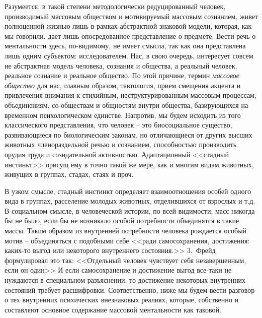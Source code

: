 Разумеется, в такой степени методологически редуцированный человек, производимый массовым обществом и
мотивируемый массовым сознанием, живет полноценной жизнью лишь в рамках абстрактной знаковой модели,
которая, как мы говорили, дает лишь опосредованное представление о предмете. Вести речь о ментальности
здесь, по-видимому, не имеет смысла, так как она представлена лишь одним субъектом: исследователем.
Нас, в свою очередь, интересует совсем не абстрактная модель человека, сознания и общества, а реальный человек,
реальное сознание и реальное общество. По этой причине, термин \emph{массовое общество} для нас, главным образом,
тавтология, прием смещения акцента и привлечения внимания к стихийным, неструктурированным массовым процессам,
объединениям, со-обществам и общностям внутри общества, базирующихся на временном психологическом единстве.
Напротив, мы будем исходить из того классического представления, что человек -- это биосоциальное существо,
развивающиеся по биологическим законам, но отличающиеся от других высших животных членораздельной речью и
сознанием, способностью производить орудия труда и созидательной активностью. Адаптационный <<стадный инстинкт>>
присущ ему в точно такой же мере, как и многим видам животных, живущих в группах, стадах, стаях и проч.

В узком смысле, стадный инстинкт определяет взаимоотношения особей одного вида в группах, расселение молодых животных,
отделившихся от взрослых и т.д. В социальном смысле, в человеческой истории, по всей видимости, масс никогда бы не
было, если бы не возникало особой потребности объединятся в такие массы. Таким образом из внутренней потребности
человека рождается особый мотив -- объединяться с подобными себе <<ради самосохранения, достижения: каких-то выгод
или некоторого внутреннего состояния.>>\autocite{olshansky} 3.~Фрейд формулировал это так: <<Отдельный человек чувствует
себя незавершенным, если он один>>\autocite{freid_mass} И если самосохранение и достижение выгод все-таки не
нуждаются в специальном разъяснении, то достижение некоторых внутренних состояний требует расшифровки.
Соответственно, ниже мы будем вести разговор о тех внутренних психических внезнаковых реалиях, которые,
собственно и составляют основное содержание массовой ментальности как таковой.

